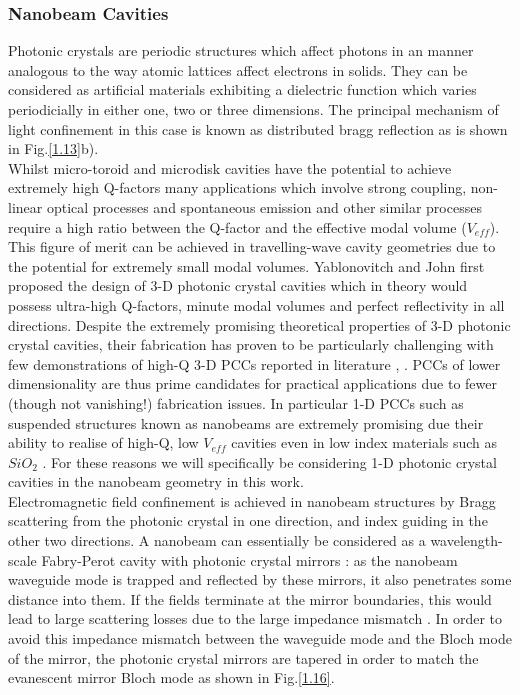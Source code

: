 \subsubsection{Nanobeam Cavities}

Photonic crystals are periodic structures which affect photons in an manner analogous to the way atomic lattices affect electrons in solids. They can be considered as artificial materials exhibiting a dielectric function which varies periodicially in either one, two or three dimensions. The principal mechanism of light confinement in this case is known as distributed bragg reflection as is shown in Fig.\ref{1.13}b).\\
Whilst micro-toroid and microdisk cavities have the potential to achieve extremely high Q-factors many applications which involve strong coupling, non-linear optical processes and spontaneous emission and other similar processes require a high ratio between the Q-factor and the effective modal volume ($V_{eff}$). This figure of merit can be achieved in travelling-wave cavity geometries due to the potential for extremely small modal volumes. Yablonovitch \cite{Yablonovitch1987} and John \cite{John1987} first proposed the design of 3-D photonic crystal cavities which in theory would possess ultra-high Q-factors, minute modal volumes and perfect reflectivity in all directions. Despite the extremely promising theoretical properties of 3-D photonic crystal cavities, their fabrication has proven to be particularly challenging with few demonstrations of high-Q 3-D PCCs reported in literature \cite{Ishizaki2013}, \cite{Tandaechanurat2011}. PCCs of lower dimensionality are thus prime candidates for practical applications due to fewer (though not vanishing!) fabrication issues. In particular 1-D PCCs such as suspended structures known as nanobeams are extremely promising due their ability to realise of high-Q, low $V_{eff}$ cavities even in low index materials such as $SiO_{2}$ \cite{Gong2010}. For these reasons we will specifically be considering 1-D photonic crystal cavities in the nanobeam geometry in this work.\\
Electromagnetic field confinement is achieved in nanobeam structures by Bragg scattering from the photonic crystal in one direction, and index guiding in the other two directions. A nanobeam can essentially be considered as a wavelength-scale Fabry-Perot cavity with photonic crystal mirrors \cite{Deotare2009}: as the nanobeam waveguide mode is trapped and reflected by these mirrors, it also penetrates some distance into them. If the fields terminate at the mirror boundaries, this would lead to large scattering losses due to the large impedance mismatch \cite{Notomi2008}. In order to avoid this impedance mismatch between the waveguide mode and the Bloch mode of the mirror, the photonic crystal mirrors are tapered in order to match the evanescent mirror Bloch mode \cite{Lalanne2003} as shown in Fig.\ref{1.16}.


